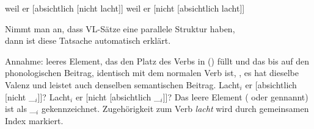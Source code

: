 {{\eal
\ex weil er [absichtlich [nicht lacht]]
\ex weil er [nicht [absichtlich lacht]]
\zl

Nimmt man an, dass VL-Sätze eine parallele Struktur haben,\\
dann ist diese Tatsache automatisch erklärt. 

\pause
Annahme: leeres Element, das den Platz des Verbs in () füllt und das bis auf den phonologischen Beitrag,
identisch mit dem normalen Verb ist, \dash, es hat dieselbe Valenz und leistet auch denselben semantischen
Beitrag. 
\eal
\ex Lacht$_i$ er [absichtlich [nicht \_$_i$]]?
\ex Lacht$_i$ er [nicht [absichtlich \_$_i$]]?
\zl
Das leere Element ( oder  gennannt) ist als \_$_i$
gekennzeichnet. Zugehörigkeit zum Verb \emph{lacht} wird durch gemeinsamen
Index markiert.

}




}

